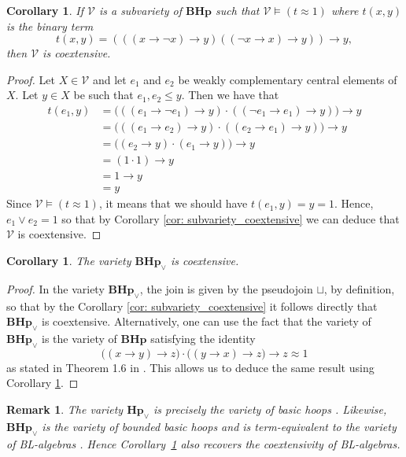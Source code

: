 \documentclass[11pt]{article}
\theoremstyle{pretty}
\newtheorem{corollary}[theorem]{Corollary}
\theoremstyle{plainnote}
\newtheorem{remark}[theorem]{Remark}
\renewcommand{\2}{\mathbf{2}}
\newcommand{\V}{\mathcal{V}}
\newcommand{\Hoop}{\mathbf{Hp}}
\newcommand{\BoundedHoop}{\mathbf{BHp}}
\begin{document}
\begin{corollary}\label{cor: term_coextensive}
If $\V$ is a subvariety of $\BoundedHoop$ such that $\V \models (t \approx 1)$ where $t(x, y)$ is the binary term \[t(x, y) = (((x \to \neg x) \to y) ((\neg x \to x) \to y)) \to y,\] then $\V$ is coextensive.
\end{corollary}
\begin{proof}
Let $X \in \V$ and let $e_1$ and $e_2$ be weakly complementary central elements of $X$. Let $y \in X$ be such that $e_1, e_2 \leq y$. Then we have that 
\begin{align*}
t(e_1, y) &= \big(((e_1 \to \neg e_1) \to y)\cdot  ((\neg e_1 \to e_1) \to y)\big) \to y \\
&= \big(((e_1 \to e_2) \to y)\cdot  ((e_2 \to e_1) \to y)\big) \to y \\
&= \big((e_2 \to y)\cdot  (e_1 \to y)\big) \to y \\
&= (1\cdot 1) \to y \\
&= 1 \to y\\
&= y
\end{align*}
Since $\V \models (t \approx 1)$, it means that we should have $t(e_1, y) = y = 1$. Hence, $e_1 \vee e_2 = 1$ so that by Corollary \ref{cor: subvariety_coextensive} we can deduce that $\V$ is coextensive.
\end{proof}

\begin{corollary} \label{cor: bh_vee_coextensive}
The variety $\BoundedHoop_\vee$ is coextensive.
\end{corollary}
\begin{proof}
In the variety $\BoundedHoop_\vee$, the join is given by the pseudojoin $\sqcup$, by definition, so that by the Corollary \ref{cor: subvariety_coextensive} it follows directly that $\BoundedHoop_\vee$ is coextensive. Alternatively, one can use the fact that the variety of $\BoundedHoop_\vee$ is the variety of $\BoundedHoop$ satisfying the identity
\[\big((x\to y) \to z\big)\cdot \big((y \to x) \to z\big) \to z \approx 1 \] as stated in Theorem 1.6 in \cite{AglianoFerreirimMontagna2007BasicHoops}. This allows us to deduce the same result using Corollary \ref{cor: term_coextensive}.
\end{proof}

\begin{remark}
The variety $\Hoop_\vee$ is precisely the variety of basic hoops \cite[Proposition~3.1 and Theorem~3.3]{Ferreirim2000ShortNote}. Likewise, $\BoundedHoop_\vee$ is the variety of bounded basic hoops and is term-equivalent to the variety of BL-algebras \cite[Section~2]{AglianoMontagna2003VarietiesBL}. Hence Corollary~\ref{cor: bh_vee_coextensive} also recovers the coextensivity of BL-algebras.
\end{remark}
\end{document}
